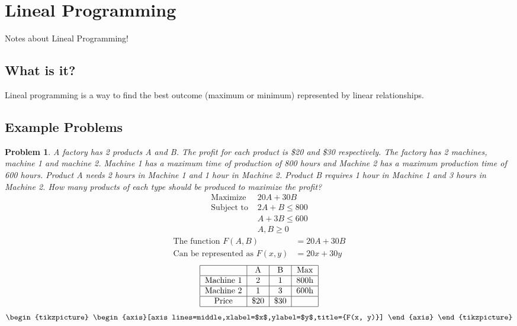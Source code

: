 \section{Lineal Programming}
Notes about Lineal Programming!
\subsection{What is it?}
Lineal programming is a way to find the best outcome (maximum or minimum) represented by linear relationships.
\subsection{Example Problems}
\newtheorem{problem}{Problem}
\begin{problem}
    A factory has 2 products A and B. The profit for each product is \$20 and \$30 respectively. The factory has 2 machines, machine 1 and machine 2. Machine 1 has a maximum time of production of 800 hours and Machine 2 has a maximum production time of 600 hours. Product A needs 2 hours in Machine 1 and 1 hour in Machine 2. Product B requires 1 hour in Machine 1 and 3 hours in Machine 2. How many products of each type should be produced to maximize the profit?
    \begin{equation}
        \begin{aligned}
            \text{Maximize } & 20A + 30B \\
            \text{Subject to } & 2A + B \leq 800 \\
            & A + 3B \leq 600 \\
            & A, B \geq 0
        \end{aligned}
    \end{equation}
    \begin{equation}
        \begin{aligned}
            \text{The function } F(A, B) & = 20A + 30B \\
            \text{Can be represented as } F(x, y) & = 20x + 30y 
        \end{aligned}
    \end{equation}
    \begin{equation}
            \begin{tabular}{|c | c | c | c|} 
                \hline
                 & A & B & Max \\
                \hline
                Machine 1 & 2 & 1 & 800h \\ 
                \hline
                Machine 2 & 1 & 3 & 600h \\
                \hline
                Price & \$20 & \$30 &  \\
                \hline
               \end{tabular}
    \end{equation}
        \begin{equation}
            \begin{tikzpicture} 
                \begin{axis}[axis lines=middle,xlabel=$x$,ylabel=$y$,title={F(x, y)}]
                    

\end{axis}
\end{tikzpicture}
\end{equation}
\end{problem}
